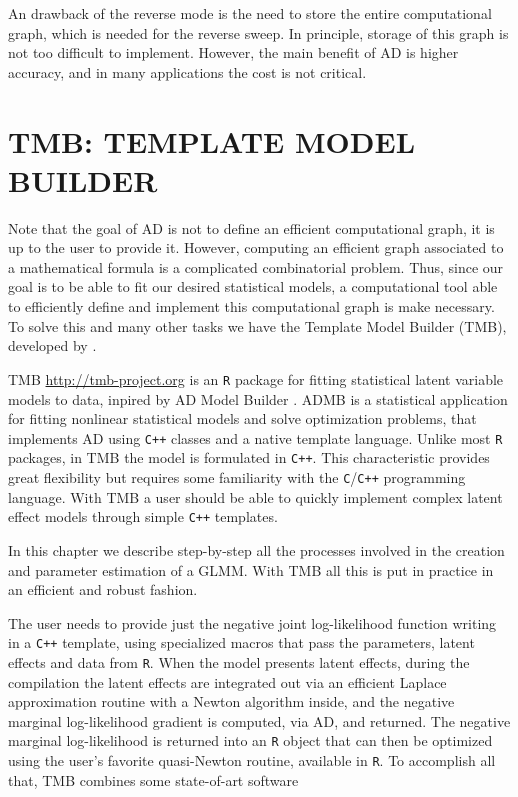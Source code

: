 An drawback of the reverse mode is the need to store the entire
computational graph, which is needed for the reverse sweep. In
principle, storage of this graph is not too difficult to implement.
However, the main benefit of AD is higher accuracy, and in many
applications the cost is not critical.

\section{TMB: TEMPLATE MODEL BUILDER}
\label{cap:tmb}

Note that the goal of AD is not to define an efficient computational
graph, it is up to the user to provide it. However, computing an
efficient graph associated to a mathematical formula is a complicated
combinatorial problem. Thus, since our goal is to be able to fit our
desired statistical models, a computational tool able to efficiently
define and implement this computational graph is make necessary. To
solve this and many other tasks we have the Template Model Builder
(TMB), developed by .

TMB \url{ http://tmb-project.org} is an \texttt{R} \cite{R20} package
for fitting statistical latent variable models to data, inpired by AD
Model Builder \cite[ADMB]{ADMB}. ADMB is a statistical application for
fitting nonlinear statistical models and solve optimization problems,
that implements AD using \texttt{C++} classes and a native template
language. Unlike most \texttt{R} packages, in TMB the model is
formulated in \texttt{C++}. This characteristic provides great
flexibility but requires some familiarity with the
\texttt{C}/\texttt{C++} programming language. With TMB a user should be
able to quickly implement complex latent effect models through simple
\texttt{C++} templates.

In this chapter we describe step-by-step all the processes involved in
the creation and parameter estimation of a GLMM. With TMB all this is
put in practice in an efficient and robust fashion.

The user needs to provide just the negative joint log-likelihood
function writing in a \texttt{C++} template, using specialized macros
that pass the parameters, latent effects and data from \texttt{R}. When
the model presents latent effects, during the compilation the latent
effects are integrated out via an efficient Laplace approximation
routine with a Newton algorithm inside, and the negative marginal
log-likelihood gradient is computed, via AD, and returned. The negative
marginal log-likelihood is returned into an \texttt{R} object that can
then be optimized using the user's favorite quasi-Newton routine,
available in \texttt{R}. To accomplish all that, TMB combines some
state-of-art software

